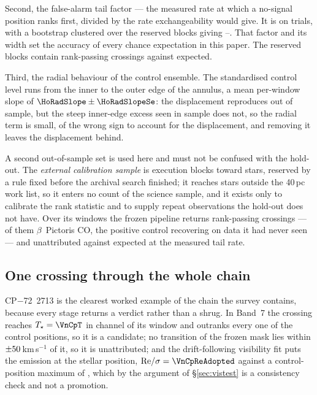 Second, the false-alarm tail factor --- the measured rate at which a
no-signal position ranks first, divided by the rate exchangeability would
give. It is \HoTailFactor{} on \HoPseudoTrials{} trials, with a bootstrap
clustered over the \HoTailBlocks{} reserved blocks giving
\HoTailLo--\HoTailHi. That factor and its width set the accuracy of every
chance expectation in this paper. The reserved blocks contain \HoStageOne{}
rank-passing crossings against \HoStageOneExp{} expected.

Third, the radial behaviour of the control ensemble. The standardised
control level runs \HoRadBins{} from the inner to the outer edge of the
annulus, a mean per-window slope of $\HoRadSlope\pm\HoRadSlopeSe$: the
displacement reproduces out of sample, but the steep inner-edge excess seen
in sample does not, so the radial term is small, of the wrong sign to account
for the displacement, and removing it leaves the displacement behind.

A second out-of-sample set is used here and must not be confused with the
hold-out. The \emph{external calibration sample} is \CampBlocks{} execution
blocks toward \CampStars{} stars, reserved by a rule fixed before the
archival search finished; it reaches stars outside the 40\,pc work list, so
it enters no count of the science sample, and it exists only to calibrate the
rank statistic and to supply repeat observations the hold-out does not have.
Over its \CampWindows{} windows the frozen pipeline returns \CampStageOne{}
rank-passing crossings --- \CampStageOneCO{} of them $\beta$~Pictoris CO,
the positive control recovering on data it had never seen --- and
\CampUnattrib{} unattributed against \CampExpUn{} expected at the measured
tail rate.

\subsection{One crossing through the whole chain}

CP$-$72~2713 is the clearest worked example of the chain the survey
contains, because every stage returns a verdict rather than a shrug. In
Band~7 the crossing reaches $T_\star=\VnCpT$ in channel \VnCpChan{} of its
window and outranks every one of the \NCtrl{} control positions, so it is a
candidate; no transition of the frozen mask lies within
$\pm50$\,km\,s$^{-1}$ of it, so it is unattributed; and the
drift-following visibility fit puts the emission at the stellar position,
${\rm Re}/\sigma=\VnCpReAdopted$ against a control-position maximum of
\VnCpCtrlAdopted, which by the argument of \S\ref{sec:vistest} is a
consistency check and not a promotion.

